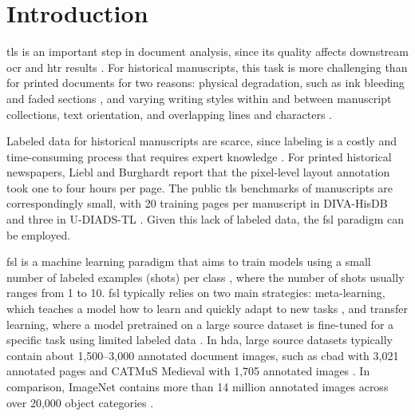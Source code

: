 \chapter{Introduction}
\label{ch:intro}

\Gls{tls} is an important step in document analysis, since its quality affects downstream \gls{ocr} and \gls{htr} results \cite{fizaine}. For historical manuscripts, this task is more challenging than for printed documents for two reasons: physical degradation, such as ink bleeding and faded sections \cite{Rabaev_Litvak_2025}, and varying writing styles within and between manuscript collections, text orientation, and overlapping lines and characters \cite{diva_hisdb}.

Labeled data for historical manuscripts are scarce, since labeling is a costly and time-consuming process that requires expert knowledge \cite{sterzinger2025fewshot}. For printed historical newspapers, Liebl and Burghardt \cite{liebl2021pagesegmentation} report that the pixel-level layout annotation took one to four hours per page. The public \gls{tls} benchmarks of manuscripts are correspondingly small, with 20 training pages per manuscript in DIVA-HisDB \cite{diva_hisdb} and three in U-DIADS-TL \cite{Zottin_2025_FEST}. Given this lack of labeled data, the \gls{fsl} paradigm can be employed.

\Gls{fsl} is a machine learning paradigm that aims to train models using a small number of labeled examples (shots) per class \cite{fsl}, where the number of shots usually ranges from 1 to 10. \Gls{fsl} typically relies on two main strategies: meta-learning, which teaches a model how to learn and quickly adapt to new tasks \cite{finn2017modelagnosticmetalearningfastadaptation}, and transfer learning, where a model pretrained on a large source dataset is fine-tuned for a specific task using limited labeled data \cite{trans_learning}. In \gls{hda}, large source datasets typically contain about 1,500--3,000 annotated document images, such as \gls{cbad} with 3,021 annotated pages \cite{DiemKleberGatos2019} and CATMuS Medieval with 1,705 annotated images \cite{catmus-medieval}. In comparison, ImageNet contains more than 14 million annotated images across over 20,000 object categories \cite{deng2009imagenet}.


